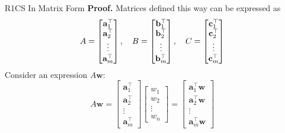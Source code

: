 \documentclass{zkdl-presentation-template}
\begin{document}
    \begin{frame}{R1CS In Matrix Form}
        \textbf{Proof.} Matrices defined this way can be expressed as
        \vspace{-5pt}
        {\scriptsize \begin{equation*}
            A = \begin{bmatrix}
                \mathbf{a}_1^{\top} \\ \mathbf{a}_2^{\top} \\ \vdots \\ \mathbf{a}_m^{\top}
            \end{bmatrix}, \quad B = \begin{bmatrix}
                \mathbf{b}_1^{\top} \\ \mathbf{b}_2^{\top} \\ \vdots \\ \mathbf{b}_m^{\top}
            \end{bmatrix}, \quad C = \begin{bmatrix}
                \mathbf{c}_1^{\top} \\ \mathbf{c}_2^{\top} \\ \vdots \\ \mathbf{c}_m^{\top}
            \end{bmatrix}
            \vspace{-5pt}
        \end{equation*}}
        \pause
        Consider an expression $A\mathbf{w}$:
        \vspace{-5pt}
        {\scriptsize \begin{equation*}
            A\mathbf{w} = \begin{bmatrix}
                \mathbf{a}_1^{\top} \\ \mathbf{a}_2^{\top} \\ \vdots \\ \mathbf{a}_m^{\top}
            \end{bmatrix}\begin{bmatrix}
                w_1 \\ w_2 \\ \vdots \\ w_n
            \end{bmatrix} = \begin{bmatrix}
                \mathbf{a}_1^{\top}\mathbf{w} \\ \mathbf{a}_2^{\top}\mathbf{w} \\ \vdots \\ \mathbf{a}_m^{\top}\mathbf{w}

\end{bmatrix}
\end{equation*}}
\end{frame}
\end{document}
